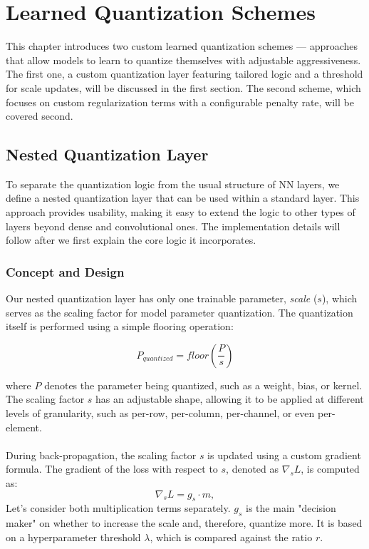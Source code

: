 \chapter{Learned Quantization\label{cha:chapter3} Schemes}
This chapter introduces two custom learned quantization schemes — approaches that allow models to learn to quantize themselves
with adjustable aggressiveness. The first one, a custom quantization layer featuring tailored logic and a threshold for scale updates,
will be discussed in the first section. The second scheme, which focuses on custom regularization terms with a configurable penalty rate,
will be covered second.


\section{Nested Quantization Layer}
\label{sec:customlayer}
To separate the quantization logic from the usual structure of NN layers,
we define a nested quantization layer that can be used within a standard layer. 
This approach provides usability, making it easy to extend the logic to other types of layers beyond dense and convolutional ones.
The implementation details will follow after we first explain the core logic it incorporates.


\subsection{Concept and Design}
\label{subsec:quantizeddense}
Our nested quantization layer has only one trainable parameter, \textit{scale} (\( s \)),
which serves as the scaling factor for model parameter quantization.
The quantization itself is performed using a simple flooring operation:

\[
  P_{quantized} = floor(\frac{P}{s})
\]

\noindent where \( P \) denotes the parameter being quantized, such as a weight, bias, or kernel.
The scaling factor \( s \) has an adjustable shape, allowing it to be applied at different levels of granularity,
such as per-row, per-column, per-channel, or even per-element. 
\\
\\
During back-propagation, the scaling factor \( s \) is updated using a custom gradient formula. 
The gradient of the loss with respect to \( s \), denoted as \( \nabla_s L \), is computed as:
\[
\nabla_s L = g_s \cdot m,
\]
Let's consider both multiplication terms separately. \(  g_s  \) is the main "decision maker" on whether to
increase the scale and, therefore, quantize more. It is based on a hyperparameter threshold  \(  \lambda  \),
which is compared against the ratio \(  r  \).

